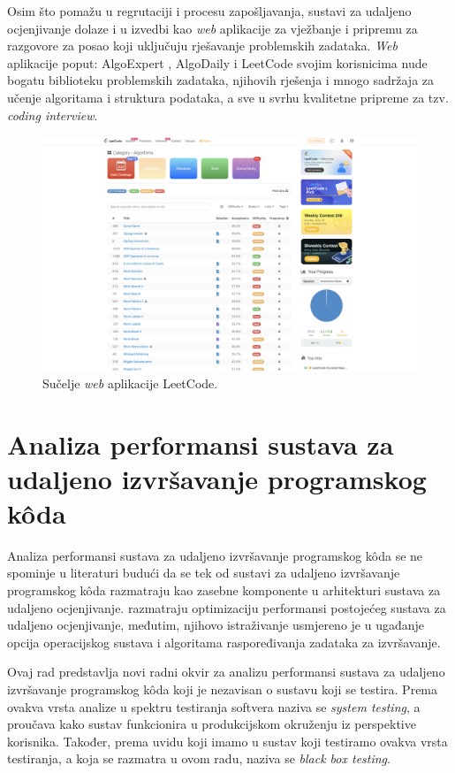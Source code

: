 \documentclass[times, utf8, diplomski]{fer}
\begin{document}
Osim što pomažu u regrutaciji i procesu zapošljavanja, sustavi za udaljeno ocjenjivanje dolaze i u izvedbi kao \textit{web} aplikacije za vježbanje i pripremu za razgovore za posao koji uključuju rješavanje problemskih zadataka. \textit{Web} aplikacije poput: AlgoExpert \citep{AlgoExpert}, AlgoDaily \citep{AlgoDaily} i LeetCode \citep{LeetCode} svojim korisnicima nude bogatu biblioteku problemskih zadataka, njihovih rješenja i mnogo sadržaja za učenje algoritama i struktura podataka, a sve u svrhu kvalitetne pripreme za tzv. \textit{coding interview}.

\begin{figure}[htb]
	\centering
	\includegraphics[width=\textwidth]{images/LeetCode UI.png}
	\caption{
		Sučelje \textit{web} aplikacije LeetCode.
	}
	\label{fig:leetcode-ui}
\end{figure}

\chapter{Analiza performansi sustava za udaljeno izvršavanje programskog kôda}
\label{chap:analysis}
Analiza performansi sustava za udaljeno izvršavanje programskog kôda se ne spominje u literaturi budući da se tek od \citep{9245310} sustavi za udaljeno izvršavanje programskog kôda razmatraju kao zasebne komponente u arhitekturi sustava za udaljeno ocjenjivanje.
\citep{drung2011enhance} razmatraju optimizaciju performansi postojećeg sustava za udaljeno ocjenjivanje, međutim, njihovo istraživanje usmjereno je u ugađanje opcija operacijskog sustava i algoritama raspoređivanja zadataka za izvršavanje.

Ovaj rad predstavlja novi radni okvir za analizu performansi sustava za udaljeno izvršavanje programskog kôda koji je nezavisan o sustavu koji se testira. Prema \citep{nidhra2012black} ovakva vrsta analize u spektru testiranja softvera naziva se \textit{system testing}, a proučava kako sustav funkcionira u produkcijskom okruženju iz perspektive korisnika. Također, prema uvidu koji imamo u sustav koji testiramo ovakva vrsta testiranja, a koja se razmatra u ovom radu, naziva se \textit{black box testing}.
\end{document}
